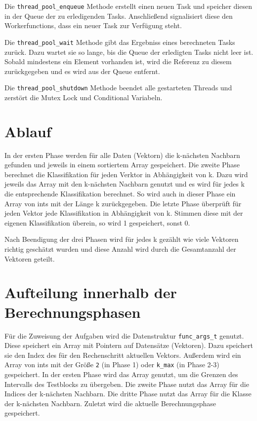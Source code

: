 \documentclass[12pt,a4paper]{article}
\begin{document}
Die \texttt{thread\_pool\_enqueue} Methode erstellt einen neuen Task und speicher diesen in der Queue der zu erledigenden Tasks.
Anschließend signalisiert diese den Workerfunctions, dass ein neuer Task zur Verfügung steht.

Die \texttt{thread\_pool\_wait} Methode gibt das Ergebniss eines berechneten Tasks zurück.
Dazu wartet sie so lange, bis die Queue der erledigten Tasks nicht leer ist.
Sobald mindestens ein Element vorhanden ist, wird die Referenz zu diesem zurückgegeben und es wird aus der Queue entfernt.


Die \texttt{thread\_pool\_shutdown} Methode beendet alle gestarteten Threads und zerstört die Mutex Lock und Conditional Variabeln.

\section{Ablauf}

In der ersten Phase werden für alle Daten (Vektorn) die k-nächsten Nachbarn gefunden und jeweils in einem sortiertem Array gespeichert.
Die zweite Phase berechnet die Klassifikation für jeden Verktor in Abhängigkeit von k.
Dazu wird jeweils das Array mit den k-nächsten Nachbarn genutzt und es wird für jedes k die entsprechende Klassifikation berechnet.
So wird auch in dieser Phase ein Array von ints mit der Länge k zurückgegeben.
Die letzte Phase überprüft für jeden Vektor jede Klassifikation in Abhängigkeit von k.
Stimmen diese mit der eigenen Klassifikation überein, so wird 1 gespeichert, sonst 0.

Nach Beendigung der drei Phasen wird für jedes k gezählt wie viele Vektoren richtig
geschätzt wurden und diese Anzahl wird durch die Gesamtanzahl der Vektoren geteilt.

\section{Aufteilung innerhalb der Berechnungsphasen}

Für die Zuweisung der Aufgaben wird die Datenstruktur \texttt{func\_args\_t} genutzt.
Diese speichert ein Array mit Pointern auf Datensätze (Vektoren).
Dazu speichert sie den Index des für den Rechenschritt aktuellen Vektors.
Außerdem wird ein Array von ints mit der Größe \texttt{2} (in Phase 1) oder \texttt{k\_max} (in Phase 2-3) gespeichert.
In der ersten Phase wird das Array genutzt, um die Grenzen des Intervalls des Testblocks zu übergeben.
Die zweite Phase nutzt das Array für die Indices der k-nächsten Nachbarn.
Die dritte Phase nutzt das Array für die Klasse der k-nächsten Nachbarn.
Zuletzt wird die aktuelle Berechnungsphase gespeichert.
\end{document}

